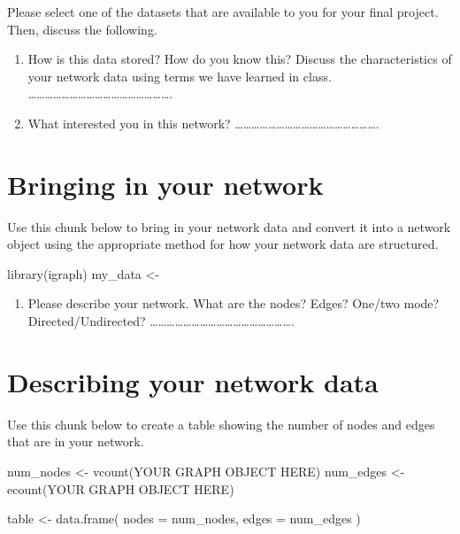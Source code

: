 \documentclass[
  letterpaper,
  DIV=11,
  numbers=noendperiod]{scrreprt}
\newenvironment{Shaded}{\begin{snugshade}}{\end{snugshade}}
\newcommand{\AttributeTok}[1]{\textcolor[rgb]{0.40,0.45,0.13}{#1}}
\newcommand{\FunctionTok}[1]{\textcolor[rgb]{0.28,0.35,0.67}{#1}}
\newcommand{\NormalTok}[1]{\textcolor[rgb]{0.00,0.23,0.31}{#1}}
\newcommand{\OtherTok}[1]{\textcolor[rgb]{0.00,0.23,0.31}{#1}}
\providecommand{\tightlist}{%
  \setlength{\itemsep}{0pt}\setlength{\parskip}{0pt}}\usepackage{longtable,booktabs,array}
\begin{document}
Please select one of the datasets that are available to you for your
final project. Then, discuss the following.

\begin{enumerate}
\def\labelenumi{\arabic{enumi})}
\item
  How is this data stored? How do you know this? Discuss the
  characteristics of your network data using terms we have learned in
  class.
  \ldots\ldots\ldots\ldots\ldots\ldots\ldots\ldots\ldots\ldots\ldots\ldots\ldots\ldots\ldots\ldots\ldots.
\item
  What interested you in this network?
  \ldots\ldots\ldots\ldots\ldots\ldots\ldots\ldots\ldots\ldots\ldots\ldots\ldots\ldots\ldots\ldots\ldots.
\end{enumerate}

\section{Bringing in your network}\label{bringing-in-your-network}

Use this chunk below to bring in your network data and convert it into a
network object using the appropriate method for how your network data
are structured.

\begin{Shaded}
\begin{Highlighting}[]
\FunctionTok{library}\NormalTok{(igraph)}
\NormalTok{my\_data }\OtherTok{\textless{}{-}} 
\end{Highlighting}
\end{Shaded}

\begin{enumerate}
\def\labelenumi{\arabic{enumi})}
\setcounter{enumi}{2}
\tightlist
\item
  Please describe your network. What are the nodes? Edges? One/two mode?
  Directed/Undirected?
  \ldots\ldots\ldots\ldots\ldots\ldots\ldots\ldots\ldots\ldots\ldots\ldots\ldots\ldots\ldots\ldots\ldots.
\end{enumerate}

\section{Describing your network
data}\label{describing-your-network-data}

Use this chunk below to create a table showing the number of nodes and
edges that are in your network.

\begin{Shaded}
\begin{Highlighting}[]
\NormalTok{num\_nodes }\OtherTok{\textless{}{-}} \FunctionTok{vcount}\NormalTok{(YOUR GRAPH OBJECT HERE)}
\NormalTok{num\_edges }\OtherTok{\textless{}{-}} \FunctionTok{ecount}\NormalTok{(YOUR GRAPH OBJECT HERE)}

\NormalTok{table }\OtherTok{\textless{}{-}} \FunctionTok{data.frame}\NormalTok{( }
  \AttributeTok{nodes =}\NormalTok{ num\_nodes,}
  \AttributeTok{edges =}\NormalTok{ num\_edges}
\NormalTok{  )}
\end{Highlighting}
\end{Shaded}
\end{document}
